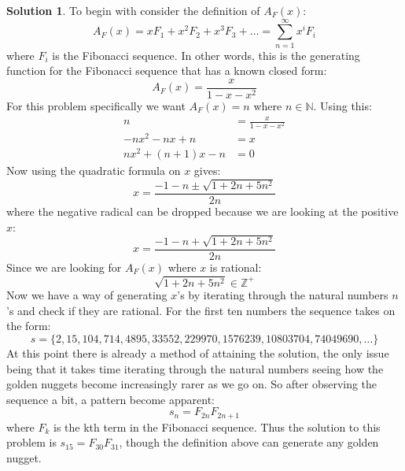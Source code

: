 \documentclass[12pt, letterpaper, onecolumn, conference, final]{IEEEtran}
\theoremstyle{definition}
\newtheorem*{solution*}{Solution}
\theoremstyle{plain}
\begin{document}
\vspace{.3cm}
\begin{solution*}
To begin with consider the definition of $A_F(x)$:
\begin{equation*}
A_F(x) = xF_1 + x^2F_2 + x^3F_3 + \dots = \sum_{n=1}^\infty x^iF_i
\end{equation*}
where $F_i$ is the Fibonacci sequence. In other words, this is the generating function for the Fibonacci sequence that has a known closed form:
\begin{equation*}
A_F(x) = \frac{x}{1 - x - x^2}
\end{equation*}
For this problem specifically we want $A_F(x) = n$ where $n \in \mathbb{N}$. Using this:
\begin{equation*}
\begin{split}
n &= \frac{x}{1 - x - x^2} \\
-nx^2 - nx + n &= x \\
nx^2 + (n + 1)x - n &= 0
\end{split}
\end{equation*}
Now using the quadratic formula on $x$ gives:
\begin{equation*}
x = \frac{-1 - n \pm \sqrt{1 + 2n + 5n^2}}{2n}
\end{equation*}
where the negative radical can be dropped because we are looking at the positive $x$:
\begin{equation*}
x = \frac{-1 - n + \sqrt{1 + 2n + 5n^2}}{2n}
\end{equation*}
Since we are looking for $A_F(x)$ where $x$ is rational:
\begin{equation*}
\sqrt{1 + 2n + 5n^2} \in \mathbb{Z}^+
\end{equation*}
Now we have a way of generating $x$'s by iterating through the natural numbers $n$'s and check if they are rational. For the first ten numbers the sequence takes on the form:
\begin{equation*}
s = \{2, 15, 104, 714, 4895, 33552, 229970, 1576239, 10803704, 74049690, \dots\}
\end{equation*}
At this point there is already a method of attaining the solution, the only issue being that it takes time iterating through the natural numbers seeing how the golden nuggets become increasingly rarer as we go on. So after observing the sequence a bit, a pattern become apparent:
\begin{equation*}
s_n = F_{2n}F_{2n+1}
\end{equation*}
where $F_k$ is the kth term in the Fibonacci sequence. Thus the solution to this problem is $s_{15} = F_{30}F_{31}$, though the definition above can generate any golden nugget.
\end{solution*}
\end{document}
